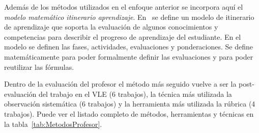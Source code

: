 

Además de los métodos utilizados en el enfoque anterior se incorpora aquí el \emph{modelo matemático itinerario aprendizaje}. En~\cite{yang2014fine} se define un modelo de itinerario de aprendizaje que soporta la evaluación de algunos conocimientos y competencias para describir el progreso de aprendizaje del estudiante. En el modelo se definen las fases, actividades, evaluaciones y ponderaciones. Se define matemáticamente para poder formalmente definir las evaluaciones y para poder reutilizar las fórmulas. 

Dentro de la evaluación del profesor el método más seguido vuelve a ser la post-evaluación del trabajo en el VLE (6 trabajos), la técnica más utilizada la observación sistemática (6 trabajos) y la herramienta más utilizada la rúbrica (4 trabajos). Puede ver el listado completo de métodos, herramientas y técnicas en la tabla~\ref{tab:MetodosProfesor}.

